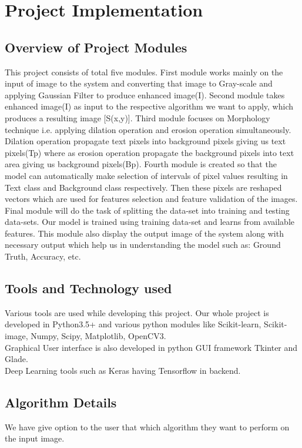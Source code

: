 \documentclass[oneside,a4paper,12pt]{report}
\begin{document}
\chapter{Project Implementation }

\section{Overview of Project Modules}
This project consists of total five modules. First module works mainly on the input of image to the system and converting that image to Gray-scale and applying Gaussian Filter to produce enhanced image(I). Second module takes enhanced image(I) as input to the respective algorithm we want to apply, which produces a resulting image [S(x,y)]. Third module focuses on Morphology technique i.e. applying dilation operation and erosion operation simultaneously. Dilation operation propagate text pixels into background pixels giving us text pixels(Tp) where as erosion operation propagate the background pixels into text area giving us background pixels(Bp). Fourth module is created so that the model can automatically make selection of intervals of pixel values resulting in Text class and Background class respectively. Then these pixels are reshaped vectors which are used for features selection and feature validation of the images. Final module will do the task of splitting the data-set into training and testing data-sets. Our model is trained using training data-set and learns from available features. This module also display the output image of the system along with necessary output which help us in understanding the model such as: Ground Truth, Accuracy, etc.

\section{Tools and Technology used}
Various tools are used while developing this project. Our whole project is developed in Python3.5+ and various python modules like Scikit-learn, Scikit-image, Numpy, Scipy, Matplotlib, OpenCV3.\\
Graphical User interface is also developed in python GUI framework Tkinter and Glade.\\
Deep Learning tools such as Keras having Tensorflow in backend.
\section{Algorithm Details}
We have give option to the user that which algorithm they want to perform on the input image.
\end{document}
